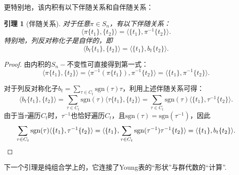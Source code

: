 \documentclass{sjtureport}
\newtheorem{lemma}[theorem]{引理}
\begin{document}
更特别地，该内积有以下伴随关系和自伴随关系：
\begin{lemma}[伴随关系]
    对于任意$\pi\in S_n$，有以下伴随关系：
    \begin{equation*}
        \langle \pi\{t_1\}, \{t_2\}\rangle = \langle \{t_1\},\pi^{-1}\{t_2\}\rangle.
    \end{equation*}
    特别地，列反对称化子是自伴的，即
    \begin{equation*}
        \langle b_t\{t_1\}, \{t_2\}\rangle = \langle \{t_1\},b_t\{t_2\}\rangle.
    \end{equation*}
\end{lemma}
\begin{proof}
    由内积的$S_n-\!$不变性可直接得到第一式：
    \begin{equation*}
        \langle \pi\{t_1\}, \{t_2\}\rangle = \langle \pi^{-1}(\pi\{t_1\}), \pi^{-1}\{t_2\}\rangle = \langle \{t_1\}, \pi^{-1}\{t_2\}\rangle.
    \end{equation*}
    
    对于列反对称化子$b_t = \sum_{\tau \in C_t} \mathrm{sgn}(\tau)\tau$，利用上述伴随关系可得：
    \begin{equation*}
        \langle b_t\{t_1\}, \{t_2\}\rangle = \sum_{\tau \in C_t} \mathrm{sgn}(\tau) \langle \tau\{t_1\}, \{t_2\}\rangle = \sum_{\tau \in C_t} \mathrm{sgn}(\tau) \langle \{t_1\}, \tau^{-1}\{t_2\}\rangle.
    \end{equation*}
    由于当$\tau$遍历$C_t$时，$\tau^{-1}$也恰好遍历$C_t$，且$\mathrm{sgn}(\tau) = \mathrm{sgn}(\tau^{-1})$，因此
    \begin{equation*}
        \sum_{\tau \in C_t} \mathrm{sgn}(\tau) \langle \{t_1\}, \tau^{-1}\{t_2\}\rangle = \langle \{t_1\}, \sum_{\tau \in C_t} \mathrm{sgn}(\tau^{-1})\tau^{-1}\{t_2\}\rangle = \langle \{t_1\}, b_t\{t_2\}\rangle. \qedhere
    \end{equation*}
\end{proof}

下一个引理是纯组合学上的，它连接了Young表的“形状”与群代数的“计算”.
\end{document}
